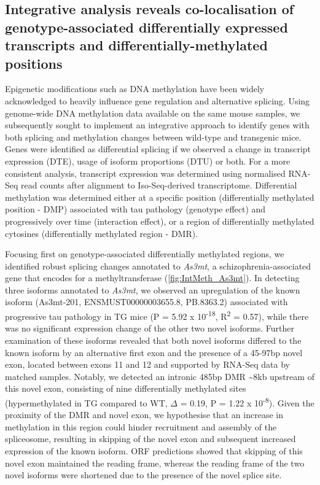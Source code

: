 \clearpage
\subsection{Integrative analysis reveals co-localisation of genotype-associated differentially expressed transcripts and differentially-methylated positions}
Epigenetic modifications such as DNA methylation have been widely acknowledged to heavily influence gene regulation and alternative splicing. Using genome-wide DNA methylation data available on the same mouse samples, we subsequently sought to implement an integrative approach to identify genes with both splicing and methylation changes between wild-type and transgenic mice. Genes were identified as differential splicing if we observed a change in transcript expression (DTE), usage of isoform proportions (DTU) or both. For a more consistent analysis, transcript expression was determined using normalised RNA-Seq read counts after alignment to Iso-Seq-derived transcriptome. Differential methylation was determined either at a specific position (differentially methylated position - DMP) associated with tau pathology (genotype effect) and progressively over time (interaction effect), or a region of differentially methylated cytosines (differentially methylated region - DMR). 

Focusing first on genotype-associated differentially methylated regions, we identified robust splicing changes annotated to \textit{As3mt}, a schizophrenia-associated gene that encodes for a methyltransferase (\cref{fig:IntMeth_As3mt}). In detecting three isoforms annotated to \textit{As3mt}, we observed an upregulation of the known isoform (As3mt-201, ENSMUST00000003655.8, PB.8363.2) associated with progressive tau pathology in TG mice (P = 5.92 x 10\textsuperscript{-18}, R\textsuperscript{2} = 0.57), while there was no significant expression change of the other two novel isoforms. Further examination of these isoforms revealed that both novel isoforms differed to the known isoform by an alternative first exon and the presence of a 45-97bp novel exon, located between exons 11 and 12 and supported by RNA-Seq data by matched samples. Notably, we detected an intronic 485bp DMR \textasciitilde{}8kb upstream of this novel exon, consisting of nine differentially methylated sites (hypermethylated in TG compared to WT, $\Delta$ = 0.19, P = 1.22 x 10\textsuperscript{-8}). Given the proximity of the DMR and novel exon, we hypothesise that an increase in methylation in this region could hinder recruitment and assembly of the spliceosome, resulting in skipping of the novel exon and subsequent increased expression of the known isoform. ORF predictions showed that skipping of this novel exon maintained the reading frame, whereas the reading frame of the two novel isoforms were shortened due to the presence of the novel splice site. 

